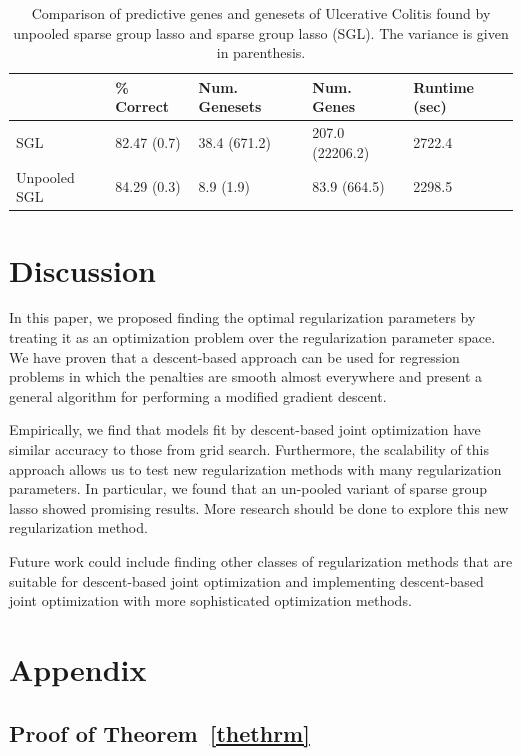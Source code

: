 \documentclass[10pt,letterpaper]{article}
\begin{document}
\begin{table}
\begin{center}
\begin{tabular}{| l | l | l | l | l | }
\hline
 & \% Correct  & Num. Genesets & Num. Genes & Runtime (sec) \\
\hline
SGL & 82.47 (0.7) & 38.4 (671.2) & 207.0 (22206.2) & 2722.4 \\
\hline
Unpooled SGL & 84.29 (0.3) & 8.9 (1.9) & 83.9 (664.5) & 2298.5 \\
\hline
\end{tabular}
\end{center}
\caption {Comparison of predictive genes and genesets of Ulcerative Colitis found by unpooled sparse group lasso and sparse group lasso (SGL). The variance is given in parenthesis.}
\label{colitis}
\end{table}

\section{Discussion}
In this paper, we proposed finding the optimal regularization parameters by treating it as an optimization problem over the regularization parameter space. We have proven that a descent-based approach can be used for regression problems in which the penalties are smooth almost everywhere and present a general algorithm for performing a modified gradient descent.

Empirically, we find that models fit by descent-based joint optimization have similar accuracy to those from grid search. Furthermore, the scalability of this approach allows us to test new regularization methods with many regularization parameters. In particular, we found that an un-pooled variant of sparse group lasso showed promising results. More research should be done to explore this new regularization method.

Future work could include finding other classes of regularization methods that are suitable for descent-based joint optimization and implementing descent-based joint optimization with more sophisticated optimization methods.

\section{Appendix}

\subsection{Proof of Theorem~\ref{thethrm}}
\end{document}
